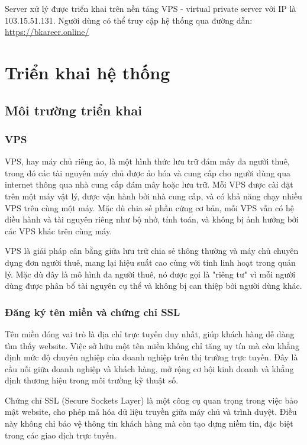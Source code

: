 Server xử lý được triển khai trên nền tảng VPS - virtual private server với IP là 103.15.51.131.
Người dùng có thể truy cập hệ thống qua đường dẫn: \href{http://bkareer.online/}{\color{black}https://bkareer.online/}

\section{Triển khai hệ thống}

\subsection{Môi trường triển khai}

\subsubsection{VPS}
VPS, hay máy chủ riêng ảo, là một hình thức lưu trữ đám mây đa người thuê, trong đó các tài nguyên máy chủ được ảo hóa và cung cấp cho người dùng qua internet thông qua nhà cung cấp đám mây hoặc lưu trữ. Mỗi VPS được cài đặt trên một máy vật lý, được vận hành bởi nhà cung cấp, và có khả năng chạy nhiều VPS trên cùng một máy. Mặc dù chia sẻ phần cứng cơ bản, mỗi VPS vẫn có hệ điều hành và tài nguyên riêng như bộ nhớ, tính toán, và không bị ảnh hưởng bởi các VPS khác trên cùng máy.

VPS là giải pháp cân bằng giữa lưu trữ chia sẻ thông thường và máy chủ chuyên dụng đơn người thuê, mang lại hiệu suất cao cùng với tính linh hoạt trong quản lý. Mặc dù đây là mô hình đa người thuê, nó được gọi là "riêng tư" vì mỗi người dùng được phân bổ tài nguyên cụ thể và không bị can thiệp bởi người dùng khác. 

\subsubsection{Đăng ký tên miền và chứng chỉ SSL}
Tên miền đóng vai trò là địa chỉ trực tuyến duy nhất, giúp khách hàng dễ dàng tìm thấy website. Việc sở hữu một tên miền không chỉ tăng uy tín mà còn khẳng định mức độ chuyên nghiệp của doanh nghiệp trên thị trường trực tuyến. Đây là cầu nối giữa doanh nghiệp và khách hàng, mở rộng cơ hội kinh doanh và khẳng định thương hiệu trong môi trường kỹ thuật số.

Chứng chỉ SSL (Secure Sockets Layer) là một công cụ quan trọng trong việc bảo mật website, cho phép mã hóa dữ liệu truyền giữa máy chủ và trình duyệt. Điều này không chỉ bảo vệ thông tin khách hàng mà còn tạo dựng niềm tin, đặc biệt trong các giao dịch trực tuyến.

